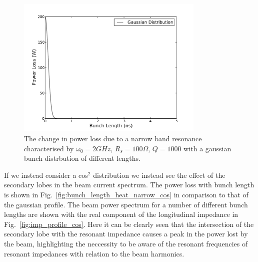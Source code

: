 \documentclass[12pt,a4paper,twopage,openright]{report}
\begin{document}
\begin{figure}
\begin{center}
\includegraphics[width=0.8\textwidth]{figures/heating_narrowband_gauss_bunch_length.pdf}
\end{center}
\label{fig:bunch_length_heat_narrow}
\caption{The change in power loss due to a narrow band resonance characterised by $\omega_{0} = 2GHz$, $R_{s} = 100\Omega$, $Q = 1000$ with a gaussian bunch distrbution of different lengths.}
\end{figure}

If we instead consider a cos$^{2}$ distribution we instead see the effect of the secondary lobes in the beam current spectrum. The power loss with bunch length is shown in Fig.~\ref{fig:bunch_length_heat_narrow_cos} in comparison to that of the gaussian profile. The beam power spectrum for a number of different bunch lengths are shown with the real component of the longitudinal impedance in Fig.~\ref{fig:imp_profile_cos}. Here it can be clearly seen that the intersection of the secondary lobe with the resonant impedance causes a peak in the power lost by the beam, highlighting the neccessity to be aware of the resonant frequencies of resonant impedances with relation to the beam harmonics.
\end{document}
